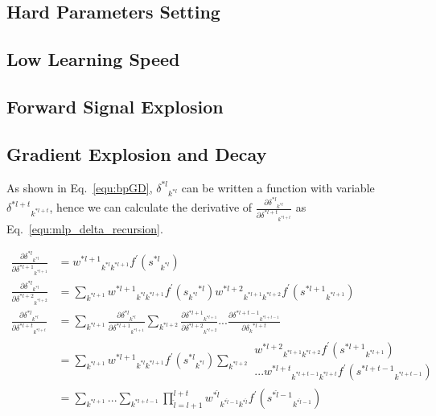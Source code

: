 \documentclass[runningheads,openany]{xhlPaper}
\begin{document}
\subsection{Hard Parameters Setting}

\subsection{Low Learning Speed}

\subsection{Forward Signal Explosion}

\subsection{Gradient Explosion and Decay}
\label{sec:mlp_gradient_explosion_dacay}
As shown in Eq.~\ref{equ:bpGD}, ${{\delta ^{*l}}_{{k^{*l}}}}$ can be written a function with variable ${{\delta ^{*l + t}}_{{k^{*l + t}}}}$, hence we can calculate the derivative of $\frac{{\partial {\delta ^{*l}}_{{k^{*l}}}}}{{\partial {\delta ^{*l + t}}_{{k^{*l + t}}}}}$ as Eq.~\ref{equ:mlp_delta_recursion}.

\begin{equation}
\label{equ:mlp_delta_recursion}
\begin{aligned}
\frac{{\partial {\delta ^{*l}}_{{k^{*l}}}}}{{\partial {\delta ^{*l + 1}}_{{k^{*l + 1}}}}} &= {w^{*l + 1}}_{{k^{*l}}{k^{*l + 1}}}{f^{'}}\left( {{s^{*l}}_{{k^{*l}}}} \right)\\
\frac{{\partial {\delta ^{*l}}_{{k^{*l}}}}}{{\partial {\delta ^{*l + 2}}_{{k^{*l + 2}}}}} &= \sum\limits_{{k^{*l + 1}}} {{w^{*l + 1}}_{{k^{*l}}{k^{*l + 1}}}{f^{'}}\left( {{s_{{k^{*l}}}}^{*l}} \right){w^{*l + 2}}_{{k^{*l + 1}}{k^{*l + 2}}}{f^{'}}\left( {{s^{*l + 1}}_{{k^{*l + 1}}}} \right)} \\
\frac{{\partial {\delta ^{*l}}_{{k^{*l}}}}}{{\partial {\delta ^{*l + t}}_{{k^{*l + t}}}}} &= \sum\limits_{{k^{*l + 1}}} {\frac{{\partial {\delta ^{*l}}_{{k^{*l}}}}}{{\partial {\delta ^{*l + 1}}_{{k^{*l + 1}}}}}\sum\limits_{{k^{*l + 2}}} {\frac{{\partial {\delta ^{*l + 1}}_{{k^{*l + 1}}}}}{{\partial {\delta ^{*l + 2}}_{{k^{*l + 2}}}}}...\frac{{\partial {\delta ^{*l + t - 1}}_{{k^{*l + t - 1}}}}}{{\partial {\delta _k}^{*l + t}}}} } \\
 &= \sum\limits_{{k^{*l + 1}}} {{w^{*l + 1}}_{{k^{*l}}{k^{*l + 1}}}{f^{'}}\left( {{s^{*l}}_{{k^{*l}}}} \right)\sum\limits_{{k^{*l + 2}}} \begin{array}{l}
{w^{*l + 2}}_{{k^{*l + 1}}{k^{*l + 2}}}{f^{'}}\left( {{s^{*l + 1}}_{{k^{*l + 1}}}} \right)\\
...{w^{*l + t}}_{{k^{*l + t - 1}}{k^{*l + t}}}{f^{'}}\left( {{s^{*l + t - 1}}_{{k^{*l + t - 1}}}} \right)
\end{array} } \\
 &= \sum\limits_{{k^{*l + 1}}} {...\sum\limits_{{k^{*l + t - 1}}} {\prod\limits_{\hat l = l + 1}^{l + t} {{w^{*\hat l}}_{{k^{*\hat l - 1}}{k^{*\hat l}}}{f^{'}}\left( {{s^{*\hat l - 1}}_{{k^{*\hat l - 1}}}} \right)} } } 
\end{aligned}
\end{equation}
\end{document}
